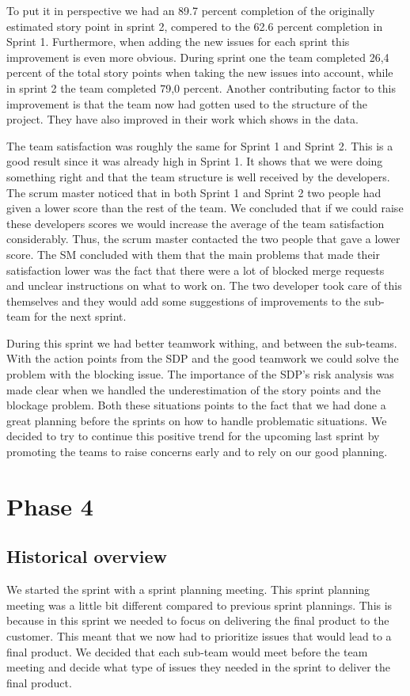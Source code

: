 \documentclass{article}
\begin{document}
To put it in perspective we had an 89.7 percent completion of the originally estimated story point in sprint 2, compered to the 62.6 percent completion in Sprint 1. Furthermore, when adding the new issues for each sprint this improvement is even more obvious. During sprint one the team completed 26,4 percent of the total story points when taking the new issues into account, while in sprint 2 the team completed 79,0 percent. Another contributing factor to this improvement is that the team now had gotten used to the structure of the project. They have also improved in their work which shows in the data. 

The team satisfaction was roughly the same for Sprint 1 and Sprint 2. This is a good result since it was already high in Sprint 1. It shows that we were doing something right and that the team structure is well received by the developers. The scrum master noticed that in both Sprint 1 and Sprint 2 two people had given a lower score than the rest of the team. We concluded that if we could raise these developers scores we would increase the average of the team satisfaction considerably. Thus, the scrum master contacted the two people that gave a lower score. The SM concluded with them that the main problems that made their satisfaction lower was the fact that there were a lot of blocked merge requests and unclear instructions on what to work on. The two developer took care of this themselves and they would add some suggestions of improvements to the sub-team for the next sprint.

During this sprint we had better teamwork withing, and between the sub-teams. With the action points from the SDP and the good teamwork we could solve the problem with the blocking issue. The importance of the SDP's risk analysis was made clear when we handled the underestimation of the story points and the blockage problem. Both these situations points to the fact that we had done a great planning before the sprints on how to handle problematic situations. We decided to try to continue this positive trend for the upcoming last sprint by promoting the teams to raise concerns early and to rely on our good planning.

\section{Phase 4} %
\subsection{Historical overview}
We started the sprint with a sprint planning meeting. This sprint planning meeting was a little bit different compared to previous sprint plannings. This is because in this sprint we needed to focus on delivering the final product to the customer. This meant that we now had to prioritize issues that would lead to a final product. We decided that each sub-team would meet before the team meeting and decide what type of issues they needed in the sprint to deliver the final product. 
\end{document}
